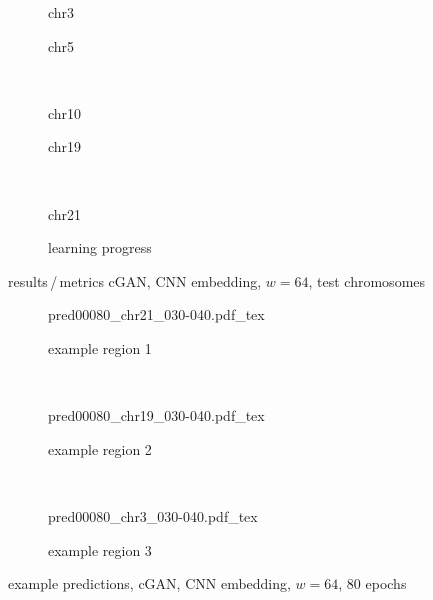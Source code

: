 \begin{figure}[p] %
    \begin{subfigure}{0.45\textwidth}
        \scriptsize
        \caption{chr3}
    \end{subfigure} \hfill
    \begin{subfigure}{0.45\textwidth}
        \scriptsize
        \caption{chr5}
    \end{subfigure}\\[5mm]
    \begin{subfigure}{0.45\textwidth}
        \scriptsize
        \caption{chr10}
    \end{subfigure}\hfill
    \begin{subfigure}{0.45\textwidth}
        \scriptsize
        \caption{chr19}
    \end{subfigure}\\[3mm]
    \begin{subfigure}{0.45\textwidth}
        \scriptsize
        \caption{chr21}
    \end{subfigure} \hfill
    \begin{subfigure}{0.45\textwidth}
        \scriptsize
        \caption{learning progress} \label{fig:results:GAN64_lossEpochs}
    \end{subfigure}
    \caption{results\,/\,metrics cGAN, CNN embedding, $w=64$, test chromosomes}   \label{fig:results:GAN64_pearson}
\end{figure}
\begin{figure}[p] %
    \begin{subfigure}{\textwidth}
        \centering
        \scriptsize
        {pred00080_chr21_030-040.pdf_tex}
        \caption{example  region 1} \label{fig:results:cGAN64_r1}
    \end{subfigure}\\[6mm]
    \begin{subfigure}{\textwidth}
        \centering
        \scriptsize
        {pred00080_chr19_030-040.pdf_tex}
        \caption{example region 2} \label{fig:results:cGAN64_r2}
    \end{subfigure}\\[6mm]
    \begin{subfigure}{\textwidth}
        \centering
        \scriptsize
        {pred00080_chr3_030-040.pdf_tex}
        \caption{example region 3} \label{fig:results:cGAN64_r3}
    \end{subfigure}
    \caption{example predictions, cGAN, CNN embedding, $w=64$, 80 epochs}
\end{figure}

